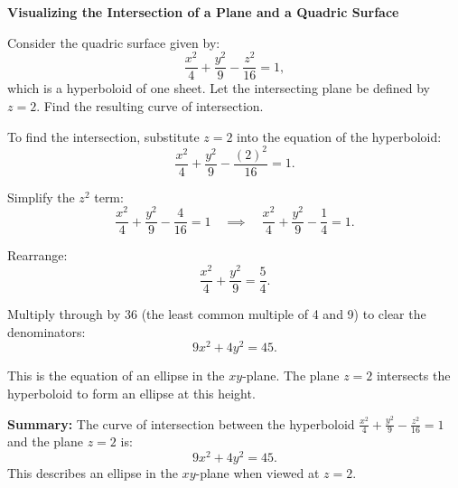 \exampleline
\begin{example}
\textbf{Visualizing the Intersection of a Plane and a Quadric Surface}

\noindent Consider the quadric surface given by:
\[
\frac{x^2}{4} + \frac{y^2}{9} - \frac{z^2}{16} = 1,
\]
which is a hyperboloid of one sheet. Let the intersecting plane be defined by \( z = 2 \). Find the resulting curve of intersection.

\begin{solution}

\noindent To find the intersection, substitute \( z = 2 \) into the equation of the hyperboloid:
\[
\frac{x^2}{4} + \frac{y^2}{9} - \frac{(2)^2}{16} = 1.
\]

\noindent Simplify the \( z^2 \) term:
\[
\frac{x^2}{4} + \frac{y^2}{9} - \frac{4}{16} = 1 \quad \implies \quad \frac{x^2}{4} + \frac{y^2}{9} - \frac{1}{4} = 1.
\]

\noindent Rearrange:
\[
\frac{x^2}{4} + \frac{y^2}{9} = \frac{5}{4}.
\]

\noindent Multiply through by 36 (the least common multiple of 4 and 9) to clear the denominators:
\[
9x^2 + 4y^2 = 45.
\]

\noindent This is the equation of an ellipse in the \( xy \)-plane. The plane \( z = 2 \) intersects the hyperboloid to form an ellipse at this height.

\noindent \textbf{Summary:} The curve of intersection between the hyperboloid \( \frac{x^2}{4} + \frac{y^2}{9} - \frac{z^2}{16} = 1 \) and the plane \( z = 2 \) is:
\[
9x^2 + 4y^2 = 45.
\]
This describes an ellipse in the \( xy \)-plane when viewed at \( z = 2 \).

\end{solution}
\end{example}




\exampleline

